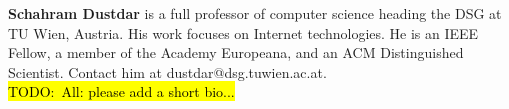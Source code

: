 \documentclass[conference]{IEEEtran}
\newcommand{\todo}[1]{\hl{TODO:~#1}}
\begin{document}
\textbf{Schahram Dustdar} 
is a full professor of computer science heading the DSG at TU 
Wien, Austria. His work focuses on Internet technologies. He is an IEEE Fellow, a member 
of the Academy Europeana, and an ACM Distinguished Scientist. Contact him at 
dustdar@dsg.tuwien.ac.at.\\

\todo{All: please add a short bio...}


\balance



\end{document}
